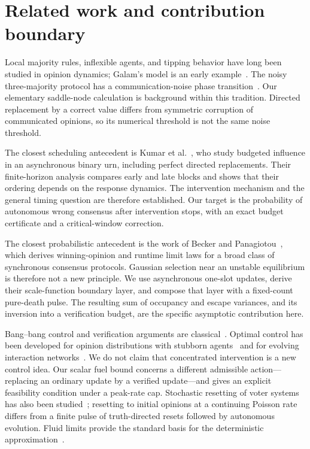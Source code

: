 \documentclass[11pt]{article}
\theoremstyle{remark}\newtheorem{remark}[theorem]{Remark}
\begin{document}
\section{Related work and contribution boundary}
\label{sec:related}
Local majority rules, inflexible agents, and tipping behavior have long been studied in opinion dynamics; Galam's model is an early example~\citep{galam2002}. The noisy three-majority protocol has a communication-noise phase transition~\citep{damore2025}. Our elementary saddle-node calculation is background within this tradition. Directed replacement by a correct value differs from symmetric corruption of communicated opinions, so its numerical threshold is not the same noise threshold.

The closest scheduling antecedent is Kumar et al.~\citep{kumar2018}, who study budgeted influence in an asynchronous binary urn, including perfect directed replacements. Their finite-horizon analysis compares early and late blocks and shows that their ordering depends on the response dynamics. The intervention mechanism and the general timing question are therefore established. Our target is the probability of autonomous wrong consensus after intervention stops, with an exact budget certificate and a critical-window correction.

The closest probabilistic antecedent is the work of Becker and Panagiotou~\citep{becker2026}, which derives winning-opinion and runtime limit laws for a broad class of synchronous consensus protocols. Gaussian selection near an unstable equilibrium is therefore not a new principle. We use asynchronous one-slot updates, derive their scale-function boundary layer, and compose that layer with a fixed-count pure-death pulse. The resulting sum of occupancy and escape variances, and its inversion into a verification budget, are the specific asymptotic contribution here.

Bang--bang control and verification arguments are classical~\citep{evans2024}. Optimal control has been developed for opinion distributions with stubborn agents~\citep{kozitsin2022} and for evolving interaction networks~\citep{nugent2024}. We do not claim that concentrated intervention is a new control idea. Our scalar fuel bound concerns a different admissible action---replacing an ordinary update by a verified update---and gives an explicit feasibility condition under a peak-rate cap. Stochastic resetting of voter systems has also been studied~\citep{grange2023}; resetting to initial opinions at a continuing Poisson rate differs from a finite pulse of truth-directed resets followed by autonomous evolution. Fluid limits provide the standard basis for the deterministic approximation~\citep{darling2002}.
\end{document}
